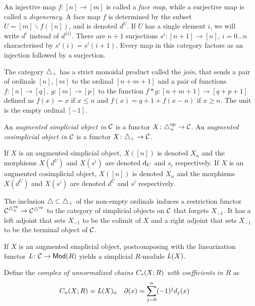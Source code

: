 An injective map $f\colon [n]\to [m]$ is called a \emph{face map}, while a surjective map is called a \emph{degeneracy}. A face map $f$ is determined by the subset $U = [m]\smallsetminus f([n])$, and is denoted $d^U$. If $U$ has a single element $i$, we will write $d^i$ instead of $d^{\{i\}}$. There are $n+1$ surjections $s^i\colon [n+1]\to [n]$, $i = 0\ldots n$ characterised by $s^i(i) = s^i(i+1)$. Every map in this category factors as an injection followed by a surjection.

The category $\asimplex$ has a strict monoidal product called the \emph{join}, that sends a pair of ordinals $[n],[m]$ to the ordinal $[n+m+1]$ and a pair of functions $f\colon [n]\to [q]$, $g\colon [m]\to [p]$ to the function $f*g\colon [n+m+1]\to [q+p+1]$ defined as $f(x) = x$ if $x\leq  n$ and $f(x) = q+1+f(x-n)$ if $x\geq n$. The unit is the empty ordinal $[-1]$.

\begin{definition}
	An \emph{augmented simplicial object in $\cC$} is a functor $X\colon \asimplex^\mathrm{op}\to \cC$.
	An \emph{augmented cosimplicial object in $\cC$} is a functor $X\colon \asimplex\to \cC$.
\end{definition}

If $X$ is an augmented simplicial object, $X([n])$ is denoted $X_n$ and the morphisms $X(d^U)$ and $X(s^i)$ are denoted $\d_U$ and $s_i$ respectively. If $X$ is an augmented cosimplicial object, $X([n])$ is denoted $X_n$ and the morphisms $X(d^U)$ and $X(s^i)$ are denoted $d^U$ and $s^i$ respectively.

The inclusion $\simplex\subset \asimplex$ of the non-empty ordinals induces a restriction functor $\cC^{\asimplex^{\op}}\to \cC^{\simplex^{\op}}$ to the category of simplicial objects on $\cC$ that forgets $X_{-1}$. It has a left adjoint that sets $X_{-1}$ to be the colimit of $X$ and a right adjoint that sets $X_{-1}$ to be the terminal object of $\cC$.

If $X$ is an augmented simplicial object, postcomposing with the linearization functor $\abel\colon \cC\to \Mod{R}$ yields a simplicial $R$-module $\abel(X)$.

Define the \emph{complex of unnormalized chains $\ucadenas(X;R)$ with coefficients in $R$} as
\begin{align*}
	\ucadenas[n](X;R) &= \abel(X)_n
	&
	\partial(x) &= \sum_{j=0}^{n} (-1)^jd_j(x)
\end{align*}


